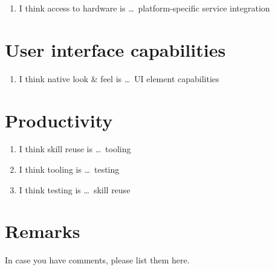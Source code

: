 \begin{enumerate}
    \item I think access to hardware is \ldots\ platform-specific service integration
    \ahpscale
\end{enumerate}

\section{User interface capabilities}

\begin{enumerate}
    \item I think native look \& feel is \ldots\ UI element capabilities
    \ahpscale
\end{enumerate}

\newpage
\section{Productivity}

\begin{enumerate}
    \item I think skill reuse is \ldots\ tooling
    \ahpscale
    
    \item I think tooling is \ldots\ testing
    \ahpscale
    
    \item I think testing is \ldots\ skill reuse
    \ahpscale
\end{enumerate}

\section{Remarks}

In case you have comments, please list them here.


